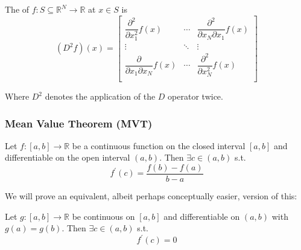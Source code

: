 \documentclass{article}
\begin{document}
\begin{definition}
  The  of $f: S \subseteq \mathbb{R}^N \to \mathbb{R}$ at $x \in S$ is
  \[
    (D^2 f)(x) = \left[\begin{matrix}
      \dfrac{\partial^2}{\partial x_1^2} f(x) & \cdots & \dfrac{\partial^2}{\partial x_N \partial x_1} f(x) \\
      \vdots & \ddots & \vdots \\
      \dfrac{\partial}{\partial x_1 \partial x_N} f(x) & \cdots & \dfrac{\partial^2}{\partial x_N^2} f(x) \\
    \end{matrix}\right]
  \]

  Where $D^2$ denotes the application of the $D$ operator twice.
\end{definition}

\subsubsection{Mean Value Theorem (MVT)}
\label{ssub:mean_value_theorem_mvt_}

\begin{theorem}\label{thm:lecture4_mvt}
  Let $f: [a, b] \to \mathbb{R}$ be a continuous function on the closed interval $[a, b]$ and differentiable on the open interval $(a, b)$. Then $\exists c \in (a, b)$ s.t.
  \[
    f^\prime(c) = \dfrac{f(b) - f(a)}{b - a}
  \]
\end{theorem}

We will prove an equivalent, albeit perhaps conceptually easier, version of this:
\begin{theorem}\label{thm:lecture4_rolles_theorem}
  Let $g: [a, b] \to \mathbb{R}$ be continuous on $[a, b]$ and differentiable on $(a, b)$ with $g(a) = g(b)$. Then $\exists c \in (a, b)$ s.t.
  \[
    f^\prime(c) = 0
  \]
\end{theorem}
\end{document}

